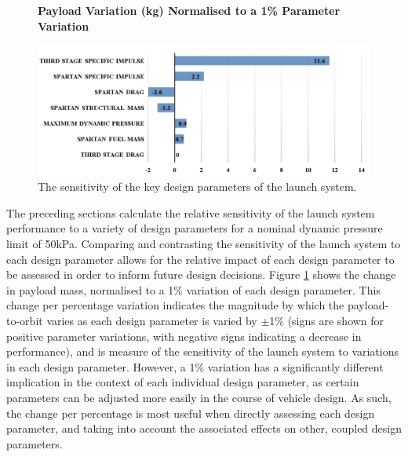 \begin{figure}[ht!]
	\centering
	\textbf{Payload Variation (kg) Normalised to a 1\% Parameter Variation}\par\medskip
	\includegraphics[width=0.99\linewidth]{figures/5_Ascent/BarChartRelativePayloadChange}
	\caption{The sensitivity of the key design parameters of the launch system.}
	\label{fig:BarChartRelativePayloadChange}
\end{figure}
\noindent
The preceding sections calculate the relative sensitivity of the launch system performance to a variety of design parameters for a nominal dynamic pressure limit of 50kPa. 
Comparing and contrasting the sensitivity of the launch system to each design parameter allows for the relative impact of each design parameter to be assessed in order to inform future design decisions. 
Figure \ref{fig:BarChartRelativePayloadChange} shows the change in payload mass, normalised to a 1\% variation of each design parameter. 
This change per percentage variation indicates the magnitude by which the payload-to-orbit varies as each design parameter is varied by $\pm$1\% (signs are shown for positive parameter variations, with negative signs indicating a decrease in performance), and is measure of the sensitivity of the launch system to variations in each design parameter. 
However, a 1\% variation has a significantly different implication in the context of each individual design parameter, as certain parameters can be adjusted more easily in the course of vehicle design. 
As such, the change per percentage is most useful when directly assessing each design parameter, and taking into account the associated effects on other, coupled design parameters. 

